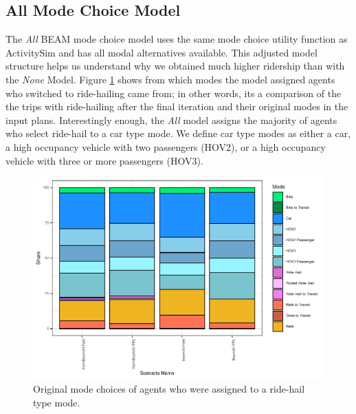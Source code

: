 \documentclass[simple, masters, twoside]{byuthesis}
\begin{document}
\hypertarget{type3}{%
\subsection{All Mode Choice Model}\label{type3}}

The \emph{All} BEAM mode choice model uses the same mode choice utility function as ActivitySim and has all modal alternatives available. This adjusted model structure helps us understand why we obtained much higher ridership than with the \emph{None} Model. Figure \ref{fig:piechart} shows from which modes the model assigned agents who switched to ride-hailing came from; in other words, its a comparison of the the trips with ride-hailing after the final iteration and their original modes in the input plans. Interestingly enough, the \emph{All} model assigns the majority of agents who select ride-hail to a car type mode. We define car type modes as either a car, a high occupancy vehicle with two passengers (HOV2), or a high occupancy vehicle with three or more passengers (HOV3).

\begin{figure}

{\centering \includegraphics{thesis_files/figure-latex/piechart-1} 

}

\caption[Original mode choices of agents who were assigned to ride-hail.]{Original mode choices of agents who were assigned to a ride-hail type mode.}\label{fig:piechart}
\end{figure}
\end{document}
